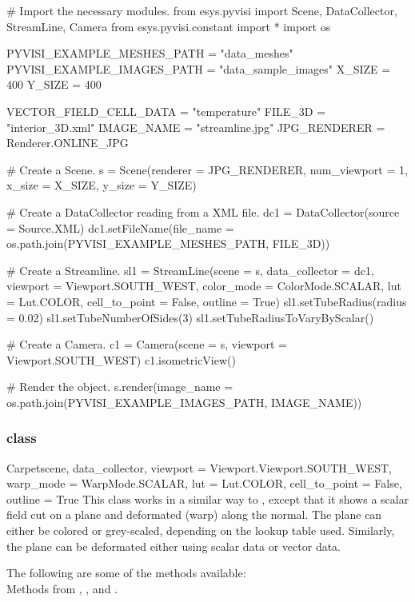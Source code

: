 \begin{python}
# Import the necessary modules.
from esys.pyvisi import Scene, DataCollector, StreamLine, Camera 
from esys.pyvisi.constant import *
import os

PYVISI_EXAMPLE_MESHES_PATH = "data_meshes"
PYVISI_EXAMPLE_IMAGES_PATH = "data_sample_images"
X_SIZE = 400
Y_SIZE = 400

VECTOR_FIELD_CELL_DATA = "temperature"
FILE_3D = "interior_3D.xml"
IMAGE_NAME = "streamline.jpg"
JPG_RENDERER = Renderer.ONLINE_JPG

# Create a Scene.
s = Scene(renderer = JPG_RENDERER, num_viewport = 1, x_size = X_SIZE, 
        y_size = Y_SIZE)

# Create a DataCollector reading from a XML file.
dc1 = DataCollector(source = Source.XML)
dc1.setFileName(file_name = os.path.join(PYVISI_EXAMPLE_MESHES_PATH, FILE_3D))

# Create a Streamline.
sl1 = StreamLine(scene = s, data_collector = dc1,
        viewport = Viewport.SOUTH_WEST, color_mode = ColorMode.SCALAR, 
        lut = Lut.COLOR, cell_to_point = False, outline = True)
sl1.setTubeRadius(radius = 0.02)
sl1.setTubeNumberOfSides(3)
sl1.setTubeRadiusToVaryByScalar()

# Create a Camera.
c1 = Camera(scene = s, viewport = Viewport.SOUTH_WEST)
c1.isometricView()

# Render the object.
s.render(image_name = os.path.join(PYVISI_EXAMPLE_IMAGES_PATH, IMAGE_NAME))
\end{python}

\subsubsection{\Carpet class}

\begin{classdesc}{Carpet}{scene, data_collector,
viewport = Viewport.Viewport.SOUTH_WEST, warp_mode = WarpMode.SCALAR, 
lut = Lut.COLOR, cell_to_point = False, outline = True}
This class works in a similar way to \MapOnPlaneCut, except that it shows a 
scalar field cut on a plane and deformated (warp) along the normal. The 
plane can either be colored or grey-scaled, depending on the lookup table used. 
Similarly, the plane can be deformated either using scalar data or vector data.
\end{classdesc}

The following are some of the methods available:\\
Methods from \ActorThreeD, \Warp, \Transform and \DataSetMapper.

